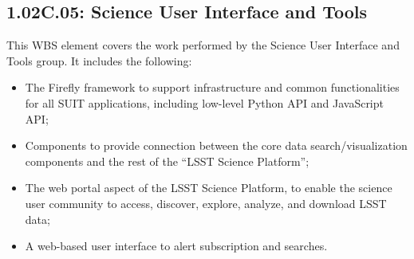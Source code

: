 \subsection*{1.02C.05: Science User Interface and Tools}

This WBS element covers the work performed by the Science User Interface and
Tools group. It includes the following:

\begin{itemize}

  \item{The Firefly framework to support infrastructure and common functionalities for all SUIT applications, including low-level Python API and JavaScript API;}
  \item{Components to provide connection between the core data search/visualization components and the rest of the ``LSST Science Platform'';}
  \item{The web portal aspect of the LSST Science Platform, to enable the science user community to access, discover, explore, analyze, and download LSST data;}
  \item{A web-based user interface to alert subscription and searches.}

\end{itemize}
